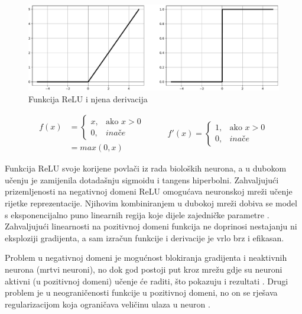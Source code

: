 \documentclass[times, utf8, numeric, diplomski]{fer}
\def\otherwise{\textit{inače}}
\begin{document}
\begin{figure}[H]
\includegraphics[width=\textwidth]{func_ReLU.pdf}
\centering
\caption{Funkcija ReLU i njena derivacija}
\label{fig:relu}
\end{figure}

\begin{equation}
\label{eq:relu}
\begin{split}
f(x) &= \begin{cases}
x,		& \text{ako } x > 0 \\
0,		& \otherwise
\end{cases} \\
&= max(0, x)
\end{split}
\qquad
\begin{split}
f'(x) = 
\begin{cases}
1,		& \text{ako } x > 0 \\
0,		& \otherwise
\end{cases}
\end{split}
\end{equation}

Funkcija ReLU svoje korijene povlači iz rada bioloških neurona, a u dubokom učenju je zamijenila dotadašnju sigmoidu i tangens hiperbolni. Zahvaljujući prizemljenosti na negativnoj domeni ReLU omogućava neuronskoj mreži učenje rijetke reprezentacije. Njihovim kombiniranjem u dubokoj mreži dobiva se model s eksponencijalno puno linearnih regija koje dijele zajedničke parametre \citep{relu_rbm}. Zahvaljujući linearnosti na pozitivnoj domeni funkcija ne doprinosi nestajanju ni eksploziji gradijenta, a sam izračun funkcije i derivacije je vrlo brz i efikasan. \citep{relu}

Problem u negativnoj domeni je mogućnost blokiranja gradijenta i neaktivnih neurona (mrtvi neuroni), no dok god postoji put kroz mrežu gdje su neuroni aktivni (u pozitivnoj domeni) učenje će raditi, što pokazuju i rezultati \citep{relu}. Drugi problem je u neograničenosti funkcije u pozitivnoj domeni, no on se rješava regularizacijom koja ograničava veličinu ulaza u neuron \citep{relu}.
\end{document}
